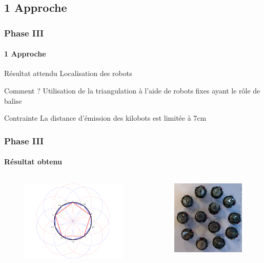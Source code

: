 \documentclass[xcolor=table]{beamer}
\begin{document}
\subsection{1 Approche}
\begin{frame}
  \frametitle{Phase III}
  \framesubtitle{1 Approche}
  \begin{block}{Résultat attendu}
    Localisation des robots
  \end{block}
  \pause
  \begin{block}{Comment ?}
    Utilisation de la triangulation à l'aide de robots fixes ayant le r\^ole de balise
  \end{block}
  \pause
  \begin{block}{Contrainte}
    La distance d'émission des kilobots est limitée à 7cm
  \end{block}
\end{frame}

\begin{frame}
  \frametitle{Phase III}
  \framesubtitle{Résultat obtenu}
  \begin{columns}[T] %
    \begin{column}{.48\textwidth}
      \begin{figure}[!h]
        \includegraphics[width=7cm]{Papproche.png}
      \end{figure}
      \pause
    \end{column}%
    \hfill%
    \begin{column}{.58\textwidth}
      \begin{figure}[!h]
        \includegraphics[width=5cm]{locate_bounding_box_demo.jpg}
      \end{figure}
    \end{column}%
  \end{columns}
\end{frame}
\end{document}
